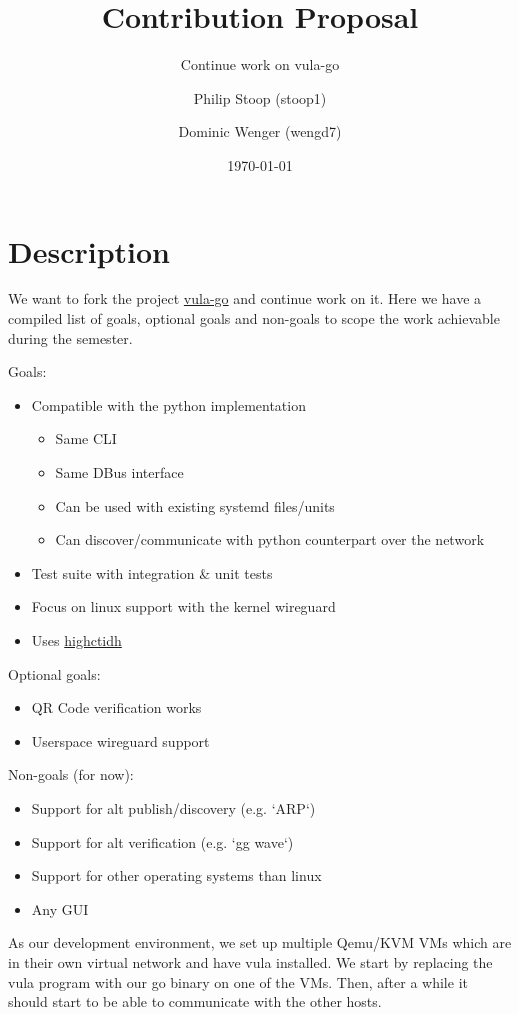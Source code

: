 \documentclass[
  invert-title=true,
  titlepage=false,
  titleimage-ratio=34
]{bfhpub}
\title{Contribution Proposal}
\subtitle{Continue work on vula-go}
\author{
	Philip Stoop (stoop1) \and Dominic Wenger (wengd7)
}
\date{\today}
\begin{document}
\maketitle

\section*{Description}

We want to fork the project \href{https://gitlab.ti.bfh.ch/vula/vula-go/}{vula-go} and continue work on it. Here we have a compiled list of goals, optional goals and non-goals to scope the work achievable during the semester.

\noindent Goals:

\begin{itemize}
	\setlength\itemsep{0em}
	\item Compatible with the python implementation
		\begin{itemize}
			\setlength\itemsep{0em}
			\item Same CLI
			\item Same DBus interface
			\item Can be used with existing systemd files/units
			\item Can discover/communicate with python counterpart over the network
		\end{itemize}
	\item Test suite with integration \& unit tests
	\item Focus on linux support with the kernel wireguard
	\item Uses \href{https://github.com/ioerror/highctidh}{highctidh}
\end{itemize}

Optional goals:

\begin{itemize}
	\setlength\itemsep{0em}
	\item QR Code verification works
	\item Userspace wireguard support
\end{itemize}

Non-goals (for now):

\begin{itemize}
	\setlength\itemsep{0em}
	\item Support for alt publish/discovery (e.g. `ARP`)
	\item Support for alt verification (e.g. `gg wave`) 
	\item Support for other operating systems than linux
	\item Any GUI
\end{itemize}

\noindent As our development environment, we set up multiple Qemu/KVM VMs which are in their own virtual network and have vula installed. We start by replacing the vula program with our go binary on one of the VMs. Then, after a while it should start to be able to communicate with the other hosts. 
\end{document}
